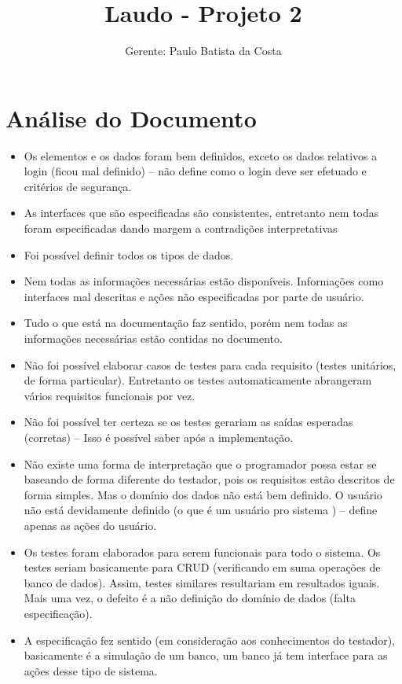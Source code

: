 \documentclass[12pt,a4paper,final]{report}
\author{Gerente: Paulo Batista da Costa}
\title{Laudo - Projeto 2}
\begin{document}
\maketitle
\section*{Análise do Documento}
\begin{itemize}
\item Os elementos e os dados foram bem definidos, exceto os dados relativos a login (ficou mal definido) -- não define como o login deve ser efetuado e critérios de segurança.
\item As interfaces que são especificadas são consistentes, entretanto nem todas foram especificadas dando margem a contradições interpretativas
\item Foi possível definir todos os tipos de dados.
\item Nem todas as informações necessárias estão disponíveis. Informações como interfaces mal descritas e ações não especificadas por parte de usuário.
\item Tudo o que está na documentação faz sentido, porém nem todas as informações necessárias estão contidas no documento.


\item Não foi possível elaborar casos de testes para cada requisito (testes unitários, de forma particular). Entretanto os testes automaticamente abrangeram vários requisitos funcionais por vez.

\item Não foi possível ter certeza se os testes gerariam as saídas esperadas (corretas) -- Isso é possível saber após a implementação.

\item Não existe uma forma de interpretação que o programador possa estar se baseando de forma diferente do testador, pois os requisitos estão descritos de forma simples. Mas o domínio dos dados não está bem definido. O usuário não está devidamente definido (o que é um usuário pro sistema ) -- define apenas as ações do usuário. 

\item Os testes foram elaborados para serem funcionais para todo o sistema. Os testes seriam basicamente para CRUD (verificando em suma operações de banco de dados). Assim, testes similares resultariam em resultados iguais. Mais uma vez, o defeito é a não definição do domínio de dados (falta especificação).

\item A especificação fez sentido (em consideração aos conhecimentos do testador), basicamente é a simulação de um banco, um banco já tem interface para as ações desse tipo de sistema. 
\end{itemize}
\newpage
\end{document}
